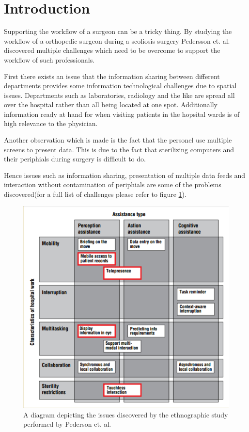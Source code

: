 \section{Introduction}
Supporting the workflow of a surgeon can be a tricky thing.
By studying the workflow of a orthopedic surgeon during a scoliosis surgery Pedersson et. al.\cite{Pederson:2015} discovered multiple challenges which need to be overcome to support the workflow of such professionals.

First there exists an issue that the information sharing between different departments provides some information technological  challenges due to spatial issues.
Departments such as laboratories, radiology and the like are spread all over the hospital rather than all being located at one spot.
Additionally information ready at hand for when visiting patients in the hopsital wards is of high relevance to the physician. 

Another observation which is made is the fact that the personel use multiple screens to present data.
This is due to the fact that sterilizing computers and their periphials during surgery is difficult to do.

Hence issues such as information sharing, presentation of multiple data feeds and interaction without contamination of periphials are some of the problems discovered(for a full list of challenges please refer to figure \ref{fig:problem}).

\begin{figure}[h]
\centering
\includegraphics[width=1\columnwidth]{img/problem_areas}
\caption{A diagram depicting the issues discovered by the ethnographic study performed by Pederson et. al. }
\label{fig:problem}
\end{figure}

